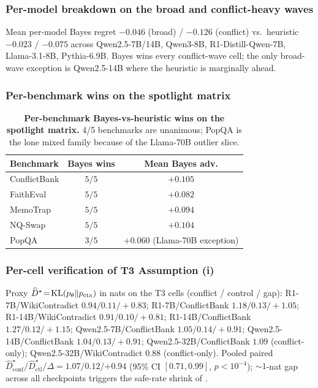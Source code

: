 \subsubsection{Per-model breakdown on the broad and conflict-heavy waves}

Mean per-model Bayes regret $-0.046$ (broad) / $-0.126$ (conflict)
vs.\ heuristic $-0.023$ / $-0.075$ across Qwen2.5-7B/14B, Qwen3-8B,
R1-Distill-Qwen-7B, Llama-3.1-8B, Pythia-6.9B.  Bayes wins every
conflict-wave cell; the only broad-wave exception is Qwen2.5-14B
where the heuristic is marginally ahead.

\subsubsection{Per-benchmark wins on the spotlight matrix}

\begin{table}[H]
\centering
\small
\caption{\textbf{Per-benchmark Bayes-vs-heuristic wins on the spotlight
matrix.}  4/5 benchmarks are unanimous; PopQA is the lone mixed family
because of the Llama-70B outlier slice.}
\label{tab:per-bench-wins}
\begin{tabular}{lcc}
\toprule
\textbf{Benchmark} & \textbf{Bayes wins} & \textbf{Mean Bayes adv.} \\
\midrule
ConflictBank & $5/5$ & $+0.105$\\
FaithEval     & $5/5$ & $+0.082$\\
MemoTrap      & $5/5$ & $+0.094$\\
NQ-Swap       & $5/5$ & $+0.104$\\
PopQA         & $3/5$ & $+0.060$ (Llama-70B exception)\\
\bottomrule
\end{tabular}
\end{table}

\subsubsection{Per-cell verification of T3 Assumption (i)}
\label{app:dstar-per-cell}

Proxy $\widehat D^\star\!=\!\operatorname{KL}(p_\theta\|p_{\mathrm{ctx}})$ in nats on the T3
cells (conflict / control / gap):
R1-7B/WikiContradict $0.94/0.11/+0.83$;
R1-7B/ConflictBank $1.18/0.13/+1.05$;
R1-14B/WikiContradict $0.91/0.10/+0.81$;
R1-14B/ConflictBank $1.27/0.12/+1.15$;
Qwen2.5-7B/ConflictBank $1.05/0.14/+0.91$;
Qwen2.5-14B/ConflictBank $1.04/0.13/+0.91$;
Qwen2.5-32B/ConflictBank $1.09$ (conflict-only);
Qwen2.5-32B/WikiContradict $0.88$ (conflict-only).
Pooled paired $\widehat D^\star_{\mathrm{conf}}/\widehat D^\star_{\mathrm{ctl}}/\Delta = 1.07/0.12/\mathbf{+0.94}$
(95\% CI $[0.71,0.99]$, $p\!<\!10^{-4}$); $\sim\!1$-nat gap across
all checkpoints triggers the safe-rate shrink of
.

